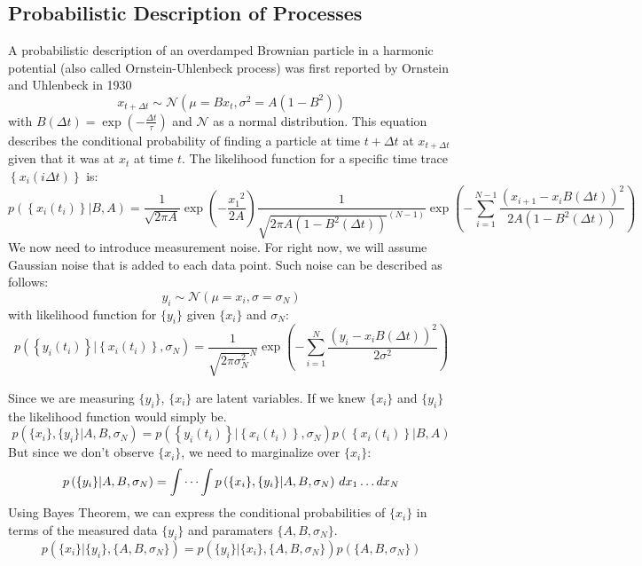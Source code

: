 \documentclass[%
 reprint,
 amsmath,amssymb,
 aps,
]{revtex4-1}
\begin{document}
\subsection{Probabilistic Description of Processes}
A probabilistic description of an overdamped Brownian particle in a harmonic potential (also called Ornstein-Uhlenbeck process) was first reported by Ornstein and Uhlenbeck in 1930 \cite{RN28}
\begin{equation}\label{OUp}
	x_{t+\Delta t} \sim \mathcal{N}(\mu=Bx_{t},\sigma^{2}=A(1-B^{2}))
\end{equation}
with $B(\Delta t) = \exp \left( { - \frac{\Delta t}{\tau}} \right)$ and $\mathcal{N}$ as a normal distribution.
This equation describes the conditional probability of finding a particle at time $t+\Delta t$ at $x_{t+\Delta t}$ given that it was at $x_{t}$ at time $t$.  The likelihood function for a specific time trace $\left\{x_i(i\Delta t)\right\}$ is:
\begin{equation}
	p\left( \left\{x_i(t_i)\right\} \left| B, A \right.\right) =
	\frac{1}{\sqrt {2 \pi A} }
	\exp \left( { - \frac{{x_1}^2}{2A}}\right)
	\frac{1}{{\sqrt {2\pi A(1-B^{2}(\Delta t))}^{(N-1)} }}
	\exp \left( { - \sum\limits_{i=1}^{N-1}\frac{{{{\left( {x_{i+1} - {x_i}B(\Delta t)} \right)}^2}}}{{2A(1-B^{2}(\Delta t))}}} \right)
\end{equation}
We now need to introduce measurement noise.  For right now, we will assume Gaussian noise that is added to each data point.  Such noise can be described as follows:
\begin{equation}
	y_{i} \sim \mathcal{N}(\mu=x_{i},\sigma=\sigma_{N})
\end{equation}
with likelihood function for $\{y_{i}\}$ given $\{x_{i}\}$ and $\sigma_{N}$:
\begin{equation}
	p\left( \left\{y_i(t_i)\right\} \left| \left\{x_i(t_i)\right\},\sigma_{N} \right.\right) =
	\frac{1}{{\sqrt {2\pi \sigma_{N}^{2}}^{N} }}
	\exp \left( { - \sum\limits_{i=1}^{N}\frac{{{{\left( {y_{i} - x_{i}B(\Delta t)} \right)}^2}}}{{2\sigma^{2}}}} \right)
\end{equation}

Since we are measuring $\{y_{i}\}$, $\{x_{i}\}$ are latent variables.  If we knew $\{x_{i}\}$ and $\{y_{i}\}$ the likelihood function would simply be.
\begin{equation}
	p\left( \{x_{i}\},\{y_{i}\}|A,B,\sigma_{N}\right) = 
	p\left( \left\{y_i(t_i)\right\} \left| \left\{x_i(t_i)\right\},\sigma_{N} \right.\right)
	p\left( \left\{x_i(t_i)\right\} \left| B, A \right.\right)
\end{equation}
But since we don't observe $\{x_{i}\}$, we need to marginalize over $\{x_{i}\}$:
\begin{equation}
p\left( \{y_{i}\}|A,B,\sigma_{N}\right) = \idotsint p\left( \{x_{i}\},\{y_{i}\}|A,B,\sigma_{N}\right) \,dx_1 \dots dx_N
\end{equation}
Using Bayes Theorem, we can express the conditional probabilities of $\{x_{i}\}$ in terms of the measured data $\{y_{i}\}$ and paramaters $\{A,B,\sigma_{N}\}$.
\begin{equation}
	p\left( \{x_{i}\}|\{y_{i}\},\{A,B,\sigma_{N}\}\right) =
	p\left( \{y_{i}\}|\{x_{i}\},\{A,B,\sigma_{N}\}\right)p\left(\{A,B,\sigma_{N}\}\right)
\end{equation}
\end{document}
